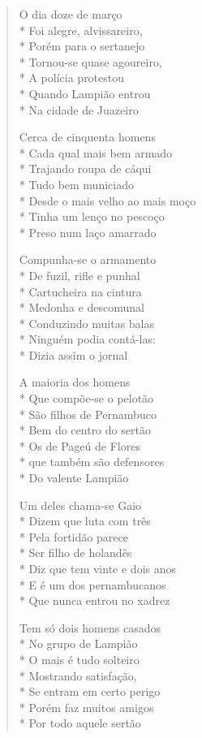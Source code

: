 \begin{verse}

O dia doze de março\\*
Foi alegre, alvissareiro,\\*
Porém para o sertanejo\\*
Tornou-se quase agoureiro,\\*
A polícia protestou\\*
Quando Lampião entrou\\*
Na cidade de Juazeiro

Cerca de cinquenta homens\\*
Cada qual mais bem armado\\*
Trajando roupa de cáqui\\*
Tudo bem municiado\\*
Desde o mais velho ao mais moço\\*
Tinha um lenço no pescoço\\*
Preso num laço amarrado

Compunha-se o armamento\\*
De fuzil, rifle e punhal\\*
Cartucheira na cintura\\*
Medonha e descomunal\\*
Conduzindo muitas balas\\*
Ninguém podia contá-las:\\*
Dizia assim o jornal

A maioria dos homens\\*
Que compõe-se o pelotão\\*
São filhos de Pernambuco\\*
Bem do centro do sertão\\*
Os de Pageú de Flores\\*
que também são defensores\\*
Do valente Lampião

Um deles chama-se Gaio\\*
Dizem que luta com três\\*
Pela fortidão parece\\*
Ser filho de holandês\\*
Diz que tem vinte e dois anos\\*
E é um dos pernambucanos\\*
Que nunca entrou no xadrez

Tem só dois homens casados\\*
No grupo de Lampião\\*
O mais é tudo solteiro\\*
Mostrando satisfação,\\*
Se entram em certo perigo\\*
Porém faz muitos amigos\\*
Por todo aquele sertão


\end{verse}
